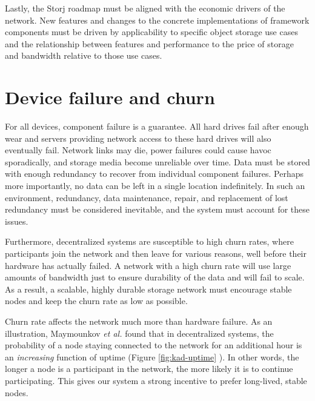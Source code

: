 \documentclass[11pt,fleqn,openany]{book}
\begin{document}
Lastly, the Storj roadmap must be aligned with the economic drivers of the
network.
New features and changes to the concrete implementations of framework
components must be driven by applicability to specific object storage use cases
and the relationship between features and performance to the price of storage
and bandwidth relative to those use cases.

\section{Device failure and churn}

For all devices, component failure is a guarantee.
All hard drives fail after enough wear
\cite{backblaze-hd-2018-q1} and servers providing network access to
these hard drives will also eventually fail. Network links may die, power
failures could cause havoc sporadically,
and storage media become unreliable over time.
Data must be stored with enough redundancy to recover from
individual component failures.
Perhaps more importantly, no data can be left in a single location
indefinitely. In such an environment, redundancy, data
maintenance, repair, and replacement of lost redundancy must be considered
inevitable, and the system must account for these issues.

Furthermore, decentralized systems are susceptible to high churn rates, where
participants join the network and then leave for various reasons, well
before their hardware has actually failed. A network with a high churn rate will
use large amounts of bandwidth just to ensure durability of the data and
will fail to scale. As a result, a scalable, highly durable storage
network must encourage stable nodes and keep the churn rate as low as possible.

Churn rate affects the network much more than hardware failure. As an
illustration, Maymounkov {\em et al.} found that in
decentralized systems, the probability of a node staying connected to the
network for an additional hour is an {\em increasing}
function of uptime (Figure \ref{fig:kad-uptime} \cite{kad}).
In other words, the longer a node is a
participant in the network, the more likely it is to continue
participating. This gives our system a strong incentive to prefer long-lived,
stable nodes.
\end{document}
